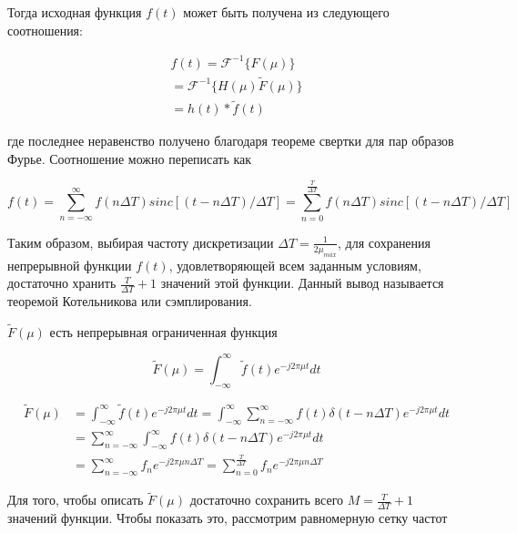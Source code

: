 \documentclass[oneside,final,14pt]{extreport}
\begin{document}
Тогда исходная функция $f(t)$ может быть получена из следующего соотношения:

\begin{gather*}
f(t)
=
\mathcal{F}^{-1}
\{ F(\mu) \}
\\
=
\mathcal{F}^{-1}
\{
H(\mu)\tilde{F}(\mu)
\}
\\
=
h(t)*\tilde{f}(t)
\end{gather*}

где последнее неравенство получено благодаря теореме свертки для пар образов Фурье. Соотношение можно переписать как

$$
\begin{equation}
f(t) 
=
\sum_{ n = - \infty}^{\infty}
f(n \varDelta T ) 
sinc[ (t - n \varDelta T) / \varDelta T	] 
=
\sum_{ n = 0}^{\frac{T}{\Delta T}}
f(n \varDelta T ) 
sinc[ (t - n \varDelta T) / \varDelta T	] 
\end{equation}
$$

Таким образом, выбирая частоту дискретизации  $\varDelta T = \frac{1}{2\mu_{max}}$, для сохранения непрерывной функции $f(t)$, удовлетворяющей всем заданным условиям, достаточно хранить $\frac{T}{\Delta T} + 1$ значений этой функции. Данный вывод называется теоремой Котельникова или сэмплирования.

$\tilde{F}(\mu)$ есть непрерывная ограниченная функция

$$
\begin{equation}
\tilde{F}(\mu)=\int_{-\infty}^{\infty} \tilde{f}(t) e^{-j 2 \pi \mu t} dt
\end{equation}
$$


$$
\begin{equation}
\begin{aligned}
\tilde{F}(\mu) &=\int_{-\infty}^{\infty} \tilde{f}(t) e^{-j 2 \pi \mu t} d t=\int_{-\infty}^{\infty} \sum_{n=-\infty}^{\infty} f(t) \delta(t-n \Delta T) e^{-j 2 \pi \mu t} d t \\
&=\sum_{n=-\infty}^{\infty} \int_{-\infty}^{\infty} f(t) \delta(t-n \Delta T) e^{-j 2 \pi \mu t} d t \\
&=\sum_{n=-\infty}^{\infty} f_{n} e^{-j 2 \pi \mu n \Delta T} =  \sum_{n=0}^{\frac{T}{\Delta T}} f_{n} e^{-j 2 \pi \mu n \Delta T}
\end{aligned}
\label{eq:discrete_image}
\end{equation}
$$


Для того, чтобы описать $\tilde{F}(\mu)$ достаточно сохранить всего $M=\frac{T}{\Delta T} + 1$ значений функции. Чтобы показать это, рассмотрим равномерную сетку частот
\end{document}
